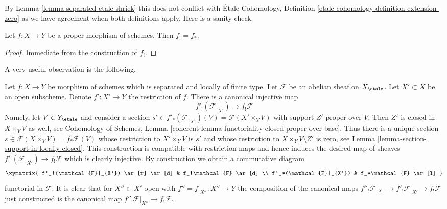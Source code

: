 \noindent
By Lemma \ref{lemma-separated-etale-shriek} this does not conflict with
\'Etale Cohomology, Definition \ref{etale-cohomology-definition-extension-zero}
as we have agreement when both definitions apply. Here is a sanity check.

\begin{lemma}
\label{lemma-proper-f-shriek}
Let $f : X \to Y$ be a proper morphism of schemes.
Then $f_! = f_*$.
\end{lemma}

\begin{proof}
Immediate from the construction of $f_!$.
\end{proof}

\noindent
A very useful observation is the following.

\begin{remark}
\label{remark-covariance-f-shriek-separated}
Let $f : X \to Y$ be morphism of schemes which is separated and
locally of finite type. Let $\mathcal{F}$ be an abelian sheaf on $X_\etale$.
Let $X' \subset X$ be an open subscheme. Denote $f' : X' \to Y$
the restriction of $f$. There is a canonical injective map
$$
f'_!(\mathcal{F}|_{X'}) \longrightarrow f_!\mathcal{F}
$$
Namely, let $V \in Y_\etale$ and consider a section
$s' \in f'_*(\mathcal{F}|_{X'})(V) = \mathcal{F}(X' \times_Y V)$
with support $Z'$ proper over $V$. Then $Z'$ is closed in $X \times_Y V$
as well, see Cohomology of Schemes, Lemma
\ref{coherent-lemma-functoriality-closed-proper-over-base}.
Thus there is a unique section
$s \in \mathcal{F}(X \times_Y V) = f_*\mathcal{F}(V)$
whose restriction to $X' \times_Y V$ is $s'$ and whose restriction
to $X \times_Y V \setminus Z'$ is zero, see
Lemma \ref{lemma-section-support-in-locally-closed}. This construction is
compatible with restriction maps and hence induces the desired map of
sheaves $f'_!(\mathcal{F}|_{X'}) \to f_!\mathcal{F}$ which is clearly
injective. By construction we obtain a commutative diagram
$$
\xymatrix{
f'_!(\mathcal{F}|_{X'}) \ar[r] \ar[d] &
f_!\mathcal{F} \ar[d] \\
f'_*(\mathcal{F}|_{X'}) &
f_*\mathcal{F} \ar[l]
}
$$
functorial in $\mathcal{F}$. It is clear that for $X'' \subset X'$ open
with $f'' = f|_{X''} : X'' \to Y$ the composition of the canonical maps
$f''_!\mathcal{F}|_{X''} \to f'_!\mathcal{F}|_{X'} \to f_!\mathcal{F}$
just constructed is the canonical map
$f''_!\mathcal{F}|_{X''} \to f_!\mathcal{F}$.
\end{remark}

